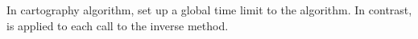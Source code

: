 In cartography algorithm, set up a global time limit to the algorithm.
In contrast,  is applied to each call to the inverse method.


%
%
%
%
%



